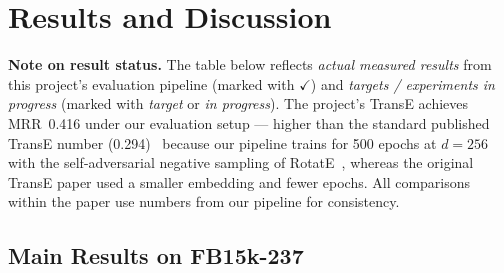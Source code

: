 \documentclass[runningheads]{llncs}
\newcommand{\inprog}[1]{\textcolor{inprogress}{\textit{#1}}}
\begin{document}
\section{Results and Discussion}
\label{sec:results}

\textbf{Note on result status.}  The table below reflects \emph{actual
measured results} from this project's evaluation pipeline (marked with
$\checkmark$) and \emph{targets / experiments in progress} (marked with
\inprog{target} or \inprog{in progress}).  The project's TransE achieves
MRR~0.416 under our evaluation setup --- higher than the standard published
TransE number (0.294)~\cite{ref_transe} because our pipeline trains for 500
epochs at $d=256$ with the self-adversarial negative sampling of
RotatE~\cite{ref_rotate}, whereas the original TransE paper used a smaller
embedding and fewer epochs.  All comparisons within the paper use numbers from
our pipeline for consistency.

\subsection{Main Results on FB15k-237}
\end{document}
